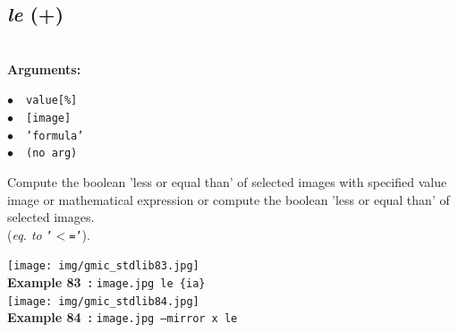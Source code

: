 \documentclass[a4paper,10.5pt,twoside]{book}
\def\comma{\discretionary{,}{}{,}}
\newcommand{\Cb}[1]{\textcolor{cb}{#1}}
\begin{document}
\subsection{\emph{le} (+)}\vspace*{-0.7em}
~\\\textbf{\Cb{Arguments: }}\begin{flushleft}
{\small \Cb{\hspace*{0.5cm}$\bullet$~~\texttt{value[\%]}}}~~~\\
{\small \Cb{\hspace*{0.5cm}$\bullet$~~\texttt{[image]}}}~~~\\
{\small \Cb{\hspace*{0.5cm}$\bullet$~~\texttt{'formula'}}}~~~\\
{\small \Cb{\hspace*{0.5cm}$\bullet$~~\texttt{(no arg)}}}\end{flushleft}
Compute the boolean 'less or equal than' of selected images with specified value{\comma} image or
mathematical expression{\comma} or compute the boolean 'less or equal than' of selected images.
~\\(\emph{eq. to} {\small \texttt{'$<$='}}).
\begin{center}\texttt{[image: img/gmic\_stdlib83.jpg]}\\
{\footnotesize \textbf{Example 83~:} \texttt{image.jpg le \{ia\}}}
\\\texttt{[image: img/gmic\_stdlib84.jpg]}\\
{\footnotesize \textbf{Example 84~:} \texttt{image.jpg --mirror x le}}
\end{center}
\end{document}
